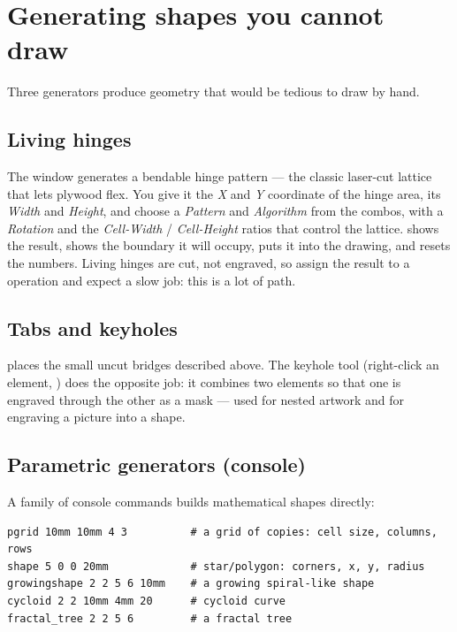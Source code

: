 \section{Generating shapes you cannot draw}

Three generators produce geometry that would be tedious to draw by hand.

\subsection*{Living hinges}

The  window generates a bendable hinge pattern --- the classic
laser-cut lattice that lets plywood flex. You give it the \emph{X} and \emph{Y}
coordinate of the hinge area, its \emph{Width} and \emph{Height}, and choose a
\emph{Pattern} and \emph{Algorithm} from the combos, with a \emph{Rotation} and
the \emph{Cell-Width} / \emph{Cell-Height} ratios that control the lattice.
 shows the result,  shows the boundary it
will occupy,  puts it into the drawing, and
 resets the numbers. Living hinges are cut, not engraved, so
assign the result to a  operation and expect a slow job: this is a
lot of path.

\subsection*{Tabs and keyholes}

 places the small uncut bridges described above. The keyhole tool
(right-click an element, ) does the opposite job: it combines
two elements so that one is engraved through the other as a mask --- used for
nested artwork and for engraving a picture into a shape.

\subsection*{Parametric generators (console)}

A family of console commands builds mathematical shapes directly:

\begin{lstlisting}[style=konsole]
pgrid 10mm 10mm 4 3          # a grid of copies: cell size, columns, rows
shape 5 0 0 20mm             # star/polygon: corners, x, y, radius
growingshape 2 2 5 6 10mm    # a growing spiral-like shape
cycloid 2 2 10mm 4mm 20      # cycloid curve
fractal_tree 2 2 5 6         # a fractal tree
\end{lstlisting}

